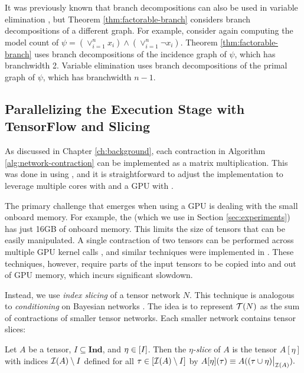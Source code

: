 It was previously known that branch decompositions can also be used in variable elimination \cite{BDP09}, but Theorem \ref{thm:factorable-branch} considers branch decompositions of a different graph. For example, consider again computing the model count of $\psi = \left(\lor_{i=1}^n x_i\right) \land \left(\lor_{i=1}^n \neg x_i\right)$. Theorem \ref{thm:factorable-branch} uses branch decompositions of the incidence graph of $\psi$, which has branchwidth 2. Variable elimination uses branch decompositions of the primal graph of $\psi$, which has branchwidth $n-1$. 

\subsection{Parallelizing the Execution Stage with TensorFlow and Slicing}
\label{sec:parallelizing:execution}
As discussed in Chapter \ref{ch:background}, each contraction in Algorithm \ref{alg:network-contraction} can be implemented as a matrix multiplication. %
This was done in \cite{DDV19} using  \cite{numpy}, and it is straightforward to adjust the implementation to leverage multiple cores with  and a GPU with  \cite{ABCCDDDGII16}.

The primary challenge that emerges when using a GPU is dealing with the small onboard memory. For example, the  (which we use in Section \ref{sec:experiments}) has just 16GB of onboard memory. This limits the size of tensors that can be easily manipulated. A single contraction of two tensors can be performed across multiple GPU kernel calls \cite{RRBSKH08}, and similar techniques were implemented in  \cite{FHZ19}. These techniques, however, require parts of the input tensors to be copied into and out of GPU memory, which incurs significant slowdown.

Instead, we use \emph{index slicing} \cite{CZHNS18,GK20,VBNHRBM19} of a tensor network $N$. This technique is analogous to \emph{conditioning} on Bayesian networks \cite{darwiche01,dechter99,pearl86,SAS94}. The idea is to represent $\mathcal{T}(N)$ as the sum of contractions of smaller tensor networks. Each smaller network contains tensor slices:

\begin{definition}
Let $A$ be a tensor, $I \subseteq \textbf{Ind}$, and $\eta \in [I]$. Then the \emph{$\eta$-slice} of $A$ is the tensor $A[\eta]$ with indices $\mathcal{I}(A) \setminus I$ defined for all $\tau \in [\mathcal{I}(A) \setminus I]$ by $A[\eta](\tau) \equiv A((\tau \cup \eta)\big|_{\mathcal{I}(A)}).$
\end{definition}

